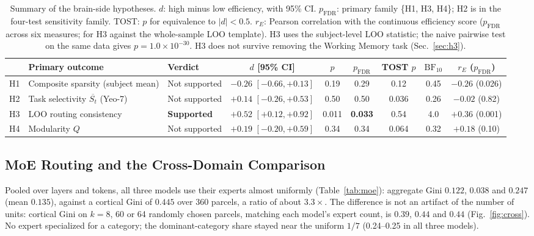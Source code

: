 \documentclass[conference]{IEEEtran}
\begin{document}
\begin{table}[t]
\caption{Summary of the brain-side hypotheses. $d$: high minus low efficiency, with 95\% CI. $p_{\text{FDR}}$: primary family \{H1, H3, H4\}; H2 is in the four-test sensitivity family. TOST: $p$ for equivalence to $|d| < 0.5$. $r_E$: Pearson correlation with the continuous efficiency score ($p_{\text{FDR}}$ across six measures; for H3 against the whole-sample LOO template). H3 uses the subject-level LOO statistic; the naive pairwise test on the same data gives $p = 1.0 \times 10^{-30}$. H3 does not survive removing the Working Memory task (Sec.~\ref{sec:h3}).}
\label{tab:summary}
\centering
\footnotesize
\setlength{\tabcolsep}{4pt}
\begin{tabular}{@{}lllcccccc@{}}
\toprule
& \textbf{Primary outcome} & \textbf{Verdict} & $d$ [95\% CI] & $p$ & $p_{\text{FDR}}$ & TOST $p$ & $\mathrm{BF}_{10}$ & $r_E$ ($p_{\text{FDR}}$) \\
\midrule
H1 & Composite sparsity (subject mean) & Not supported & $-0.26$ $[-0.66, +0.13]$ & 0.19 & 0.29 & 0.12 & 0.45 & $-0.26$ (0.026) \\
H2 & Task selectivity $\overline{S_t}$ (Yeo-7) & Not supported & $+0.14$ $[-0.26, +0.53]$ & 0.50 & 0.50 & 0.036 & 0.26 & $-0.02$ (0.82) \\
H3 & LOO routing consistency & \textbf{Supported} & $+0.52$ $[+0.12, +0.92]$ & 0.011 & \textbf{0.033} & 0.54 & 4.0 & $+0.36$ (0.001) \\
H4 & Modularity $Q$ & Not supported & $+0.19$ $[-0.20, +0.59]$ & 0.34 & 0.34 & 0.064 & 0.32 & $+0.18$ (0.10) \\
\bottomrule
\end{tabular}
\end{table}

\subsection{MoE Routing and the Cross-Domain Comparison}

Pooled over layers and tokens, all three models use their experts almost uniformly (Table~\ref{tab:moe}): aggregate Gini $0.122$, $0.038$ and $0.247$ (mean $0.135$), against a cortical Gini of $0.445$ over 360 parcels, a ratio of about $3.3\times$. The difference is not an artifact of the number of units: cortical Gini on $k = 8$, 60 or 64 randomly chosen parcels, matching each model's expert count, is $0.39$, $0.44$ and $0.44$ (Fig.~\ref{fig:cross}). No expert specialized for a category; the dominant-category share stayed near the uniform $1/7$ (0.24--0.25 in all three models).
\end{document}
